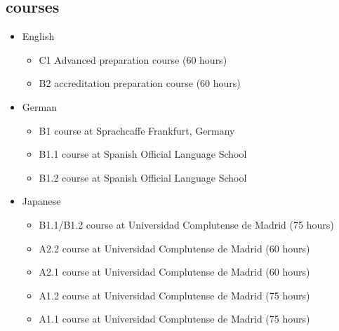 \documentclass[]{friggeri-cv}
\begin{document}
\subsection{courses}
    \begin{itemize}
    \setlength\itemsep{-0.4em}
    \item English
    \begin{itemize}
        \item C1 Advanced preparation course (60 hours) \hfill %
        \item B2 accreditation preparation course (60 hours)
    \end{itemize}
    \item German
    \begin{itemize}
        \item B1 course at Sprachcaffe Frankfurt, Germany
        \item B1.1 course at Spanish Official Language School
        \item B1.2 course at Spanish Official Language School
    \end{itemize}
    \item Japanese \hfill 
    \begin{itemize}
        \item B1.1/B1.2 course at Universidad Complutense de Madrid (75 hours)
        \item A2.2 course at Universidad Complutense de Madrid (60 hours)
        \item A2.1 course at Universidad Complutense de Madrid (60 hours)
        \item A1.2 course at Universidad Complutense de Madrid (75 hours)
        \item A1.1 course at Universidad Complutense de Madrid (75 hours)
    \end{itemize}
\end{itemize}

\end{document}
